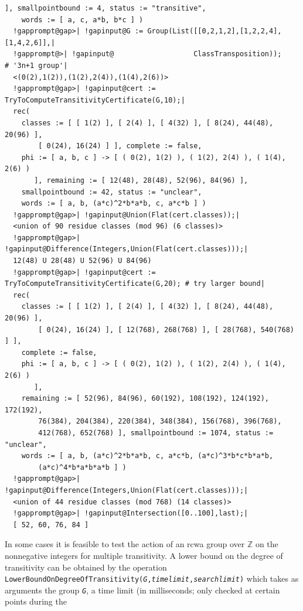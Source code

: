 \documentclass[a4paper,11pt]{report}
\begin{document}
{{\begin{Verbatim}[commandchars=!@|,fontsize=\small,frame=single,label=Example]
       ], smallpointbound := 4, status := "transitive", 
    words := [ a, c, a*b, b*c ] )
  !gapprompt@gap>| !gapinput@G := Group(List([[0,2,1,2],[1,2,2,4],[1,4,2,6]],|
  !gapprompt@>| !gapinput@                   ClassTransposition));              # '3n+1 group'|
  <(0(2),1(2)),(1(2),2(4)),(1(4),2(6))>
  !gapprompt@gap>| !gapinput@cert := TryToComputeTransitivityCertificate(G,10);|
  rec(
    classes := [ [ 1(2) ], [ 2(4) ], [ 4(32) ], [ 8(24), 44(48), 20(96) ], 
        [ 0(24), 16(24) ] ], complete := false, 
    phi := [ a, b, c ] -> [ ( 0(2), 1(2) ), ( 1(2), 2(4) ), ( 1(4), 2(6) ) 
       ], remaining := [ 12(48), 28(48), 52(96), 84(96) ], 
    smallpointbound := 42, status := "unclear", 
    words := [ a, b, (a*c)^2*b*a*b, c, a*c*b ] )
  !gapprompt@gap>| !gapinput@Union(Flat(cert.classes));|
  <union of 90 residue classes (mod 96) (6 classes)>
  !gapprompt@gap>| !gapinput@Difference(Integers,Union(Flat(cert.classes)));|
  12(48) U 28(48) U 52(96) U 84(96)
  !gapprompt@gap>| !gapinput@cert := TryToComputeTransitivityCertificate(G,20); # try larger bound|
  rec(
    classes := [ [ 1(2) ], [ 2(4) ], [ 4(32) ], [ 8(24), 44(48), 20(96) ], 
        [ 0(24), 16(24) ], [ 12(768), 268(768) ], [ 28(768), 540(768) ] ], 
    complete := false, 
    phi := [ a, b, c ] -> [ ( 0(2), 1(2) ), ( 1(2), 2(4) ), ( 1(4), 2(6) ) 
       ], 
    remaining := [ 52(96), 84(96), 60(192), 108(192), 124(192), 172(192), 
        76(384), 204(384), 220(384), 348(384), 156(768), 396(768), 
        412(768), 652(768) ], smallpointbound := 1074, status := "unclear", 
    words := [ a, b, (a*c)^2*b*a*b, c, a*c*b, (a*c)^3*b*c*b*a*b, 
        (a*c)^4*b*a*b*a*b ] )
  !gapprompt@gap>| !gapinput@Difference(Integers,Union(Flat(cert.classes)));|
  <union of 44 residue classes (mod 768) (14 classes)>
  !gapprompt@gap>| !gapinput@Intersection([0..100],last);|
  [ 52, 60, 76, 84 ]
\end{Verbatim}
  In some cases it is feasible to test the action of an rcwa group over
{\ensuremath{\mathbb Z}} on the nonnegative integers for multiple
transitivity. A lower bound on the degree of transitivity can be obtained by
the operation \texttt{LowerBoundOnDegreeOfTransitivity(\mbox{\texttt{\mdseries\slshape G}},\mbox{\texttt{\mdseries\slshape timelimit}},\mbox{\texttt{\mdseries\slshape searchlimit}})} which takes as arguments the group \mbox{\texttt{\mdseries\slshape G}}, a time limit (in milliseconds; only checked at certain points during the
}}
\end{document}
